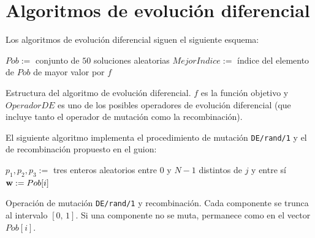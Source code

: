 \documentclass{article}
\newenvironment{algo}{
	\vspace*{0.5cm}
	\begin{algorithm}[H]}{
	\end{algorithm}
	\vspace*{0.5cm}
}
\begin{document}
\newpage
\section{Algoritmos de evolución diferencial}

Los algoritmos de evolución diferencial siguen el siguiente esquema:

\begin{algo}
	\BlankLine
	
	$Pob :=$ conjunto de $50$ soluciones aleatorias\;
	$MejorIndice := $ índice del elemento de $Pob$ de mayor valor por $f$\;
	

	\vspace{0.2cm}
	\caption{Estructura del algoritmo de evolución diferencial. $f$ es la función objetivo y $OperadorDE$ es uno de los posibles operadores de evolución diferencial (que incluye tanto el operador de mutación como la recombinación).}
\end{algo}

El siguiente algoritmo implementa el procedimiento de mutación \texttt{DE/rand/1} y el de recombinación propuesto en el guion:

\begin{algo}
	\BlankLine

	$p_1, p_2, p_3 := $ tres enteros aleatorios entre $0$ y $N-1$ distintos de $j$ y entre sí\;
	$\normalfont \textbf w := Pob[i]$\;
	\vspace{0.2cm}
	\caption{Operación de mutación \texttt{DE/rand/1} y recombinación. Cada componente se trunca al intervalo $[0,\,1]$. Si una componente no se muta, permanece como en el vector $Pob[i]$.}
\end{algo}
\end{document}
